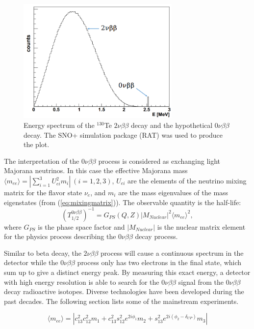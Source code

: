 \begin{figure}[htbp]
	\centering	
	\includegraphics[width=8cm]{Te130_energy0vbb.png}
	\caption{Energy spectrum of the $^{130}$Te $2\nu\beta\beta$ decay and the hypothetical $0\nu\beta\beta$ decay. The SNO+ simulation package (RAT) was used to produce the plot.}
	\label{te130energy}
\end{figure}

The interpretation of the $0\nu\beta\beta$ process is considered as exchanging light Majorana neutrinos. In this case the effective Majorana mass $\langle m_{ee}\rangle=|\sum_{i=1}^{3} U_{ei}^2m_i|~(i=1,2,3)$, $U_{ei}$ are the elements of the neutrino mixing matrix for the flavor state $\nu_e$, and $m_i$ are the mass eigenvalues of the mass eigenstates (from (\ref{eq:mixingmatrix})). The observable quantity is the half-life:
\begin{equation}
(T^{0\nu\beta\beta}_{1/2})^{-1} = G_{PS}(Q,Z)|M_{Nuclear}|^2\langle m_{ee}\rangle^2, 
\end{equation}
where $G_{PS}$ is the phase space factor and $|M_{Nuclear}|$ is the nuclear matrix element for the physics process describing the $0\nu\beta\beta$ decay process\cite{zuber2011neutrino}.

Similar to beta decay, the $2\nu\beta\beta$ process will cause a continuous spectrum in the detector while the $0\nu\beta\beta$ process only has two electrons in the final state, which sum up to give a distinct energy peak. By measuring this exact energy, a detector with high energy resolution is able to search for the $0\nu\beta\beta$ signal from the $0\nu\beta\beta$ decay radioactive isotopes. Diverse technologies have been developed during the past decades. The following section lists some of the mainstream experiments.

\begin{equation}
\langle m_{ee} \rangle = |c^2_{13}c^2_{12}m_1+c^2_{13}s^2_{12}e^{2i\phi_1}m_2+s^2_{13}e^{2i(\phi_2-\delta_{CP})}m_3|
\end{equation}

